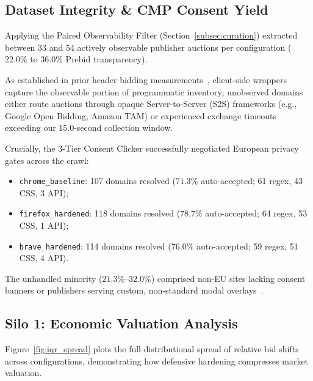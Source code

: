 \subsection{Dataset Integrity \& CMP Consent Yield}
\label{subsec:observability_yield}

Applying the Paired Observability Filter (Section~\ref{subsec:curation}) extracted between 33 and 54 actively observable publisher auctions per configuration ($22.0\%$ to $36.0\%$ Prebid transparency). 

As established in prior header bidding measurements~\cite{pachilakis2019no, cook2020inferring}, client-side wrappers capture the observable portion of programmatic inventory; unobserved domains either route auctions through opaque Server-to-Server (S2S) frameworks (e.g., Google Open Bidding, Amazon TAM) or experienced exchange timeouts exceeding our 15.0-second collection window. 

Crucially, the 3-Tier Consent Clicker successfully negotiated European privacy gates across the crawl:
\begin{itemize}
    \item \texttt{chrome\_baseline}: 107 domains resolved ($71.3\%$ auto-accepted; 61 regex, 43 CSS, 3 API);
    \item \texttt{firefox\_hardened}: 118 domains resolved ($78.7\%$ auto-accepted; 64 regex, 53 CSS, 1 API);
    \item \texttt{brave\_hardened}: 114 domains resolved ($76.0\%$ auto-accepted; 59 regex, 51 CSS, 4 API).
\end{itemize}
The unhandled minority ($21.3\%$--$32.0\%$) comprised non-EU sites lacking consent banners or publishers serving custom, non-standard modal overlays~\cite{papadogiannakis2021user}.

\subsection{Silo 1: Economic Valuation Analysis}
\label{subsec:silo_econ}

Figure~\ref{fig:iqr_spread} plots the full distributional spread of relative bid shifts across configurations, demonstrating how defensive hardening compresses market valuation.

